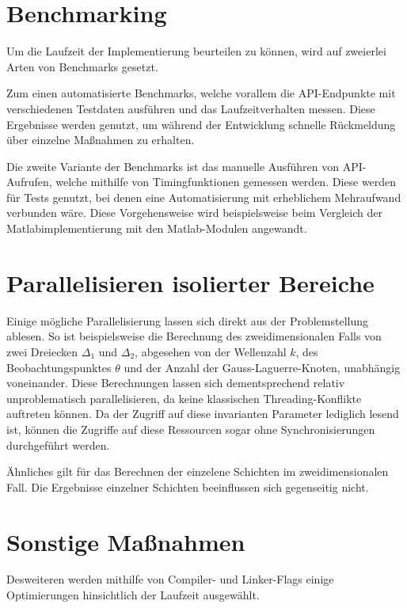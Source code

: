 \section{Benchmarking}


Um die Laufzeit der Implementierung beurteilen zu können, wird auf zweierlei Arten von Benchmarks gesetzt.

Zum einen automatisierte Benchmarks, welche vorallem die API-Endpunkte mit verschiedenen Testdaten ausführen und das Laufzeitverhalten messen.
Diese Ergebnisse werden genutzt, um während der Entwicklung schnelle Rückmeldung über einzelne Maßnahmen zu erhalten.

Die zweite Variante der Benchmarks ist das manuelle Ausführen von API-Aufrufen, welche mithilfe von Timingfunktionen gemessen werden.
Diese werden für Tests genutzt, bei denen eine Automatisierung mit erheblichem Mehraufwand verbunden wäre.
Diese Vorgehensweise wird beispielsweise beim Vergleich der Matlabimplementierung mit den Matlab-Modulen angewandt. 

\section{Parallelisieren isolierter Bereiche}

Einige mögliche Parallelisierung lassen sich direkt aus der Problemstellung ablesen. 
So ist beispielsweise die Berechnung des zweidimensionalen Falls von zwei Dreiecken $\Delta_1$ und $\Delta_2$, abgesehen von 
der Wellenzahl $k$, des Beobachtungspunktes $\theta$ und der Anzahl der Gauss-Laguerre-Knoten, unabhängig voneinander.
Diese Berechnungen lassen sich dementsprechend relativ unproblematisch parallelisieren, da keine klassischen Threading-Konflikte auftreten können.
Da der Zugriff auf diese invarianten Parameter lediglich lesend ist, können die Zugriffe auf diese Ressourcen sogar ohne Synchronisierungen durchgeführt werden.

Ähnliches gilt für das Berechnen der einzelene Schichten im zweidimensionalen Fall. Die Ergebnisse einzelner Schichten beeinflussen sich gegenseitig nicht.

\section{Sonstige Maßnahmen}

Desweiteren werden mithilfe von Compiler- und Linker-Flags einige Optimierungen hinsichtlich der Laufzeit ausgewählt.